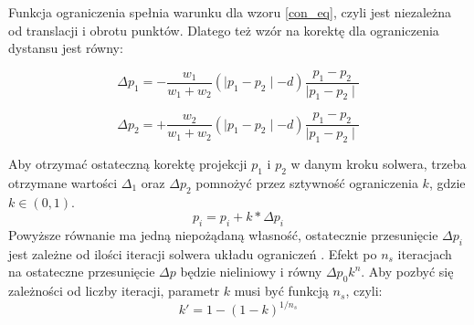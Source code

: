 Funkcja ograniczenia spełnia warunku dla wzoru \ref{con_eq}, czyli jest
niezależna od translacji i obrotu punktów. Dlatego też wzór na korektę dla
ograniczenia dystansu jest równy:

$$\Delta p_1 = - \frac{w_1}{w_1 + w_2} (\mid p_1 - p_2 \mid - d)\frac{p_1 -
	p_2}{\mid p_1 - p_2 \mid}$$

$$\Delta p_2 = + \frac{w_2}{w_1 + w_2} (\mid p_1 - p_2 \mid - d)\frac{p_1 -
	p_2}{\mid p_1 - p_2 \mid}$$

Aby otrzymać ostateczną korektę projekcji $p_1$ i $p_2$ w danym kroku solwera,
	trzeba otrzymane wartości $\Delta _1$ oraz $\Delta p_2$ pomnożyć przez
	sztywność ograniczenia $k$, gdzie $k \in (0, 1)$. 
	$$ p_i = p_i + k * \Delta p_i$$
	Powyższe równanie ma jedną niepożądaną własność, ostatecznie przesunięcie
	$\Delta p_i$ jest zależne od ilości iteracji solwera układu ograniczeń
	. Efekt po $n_s$ iteracjach na ostateczne przesunięcie $\Delta p$
	będzie nieliniowy i równy $\Delta p_0 k^n$. Aby pozbyć się zależności od
	liczby iteracji, parametr $k$ musi być funkcją $n_s$, czyli:
	$$ k' = 1 - (1 - k)^{1/n_s}$$

